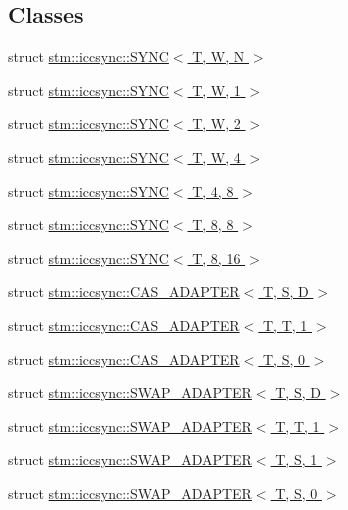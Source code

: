 \subsection*{Classes}
\begin{DoxyCompactItemize}
\item 
struct \hyperlink{structstm_1_1iccsync_1_1SYNC}{stm\-::iccsync\-::\-S\-Y\-N\-C$<$ T, W, N $>$}
\item 
struct \hyperlink{structstm_1_1iccsync_1_1SYNC_3_01T_00_01W_00_011_01_4}{stm\-::iccsync\-::\-S\-Y\-N\-C$<$ T, W, 1 $>$}
\item 
struct \hyperlink{structstm_1_1iccsync_1_1SYNC_3_01T_00_01W_00_012_01_4}{stm\-::iccsync\-::\-S\-Y\-N\-C$<$ T, W, 2 $>$}
\item 
struct \hyperlink{structstm_1_1iccsync_1_1SYNC_3_01T_00_01W_00_014_01_4}{stm\-::iccsync\-::\-S\-Y\-N\-C$<$ T, W, 4 $>$}
\item 
struct \hyperlink{structstm_1_1iccsync_1_1SYNC_3_01T_00_014_00_018_01_4}{stm\-::iccsync\-::\-S\-Y\-N\-C$<$ T, 4, 8 $>$}
\item 
struct \hyperlink{structstm_1_1iccsync_1_1SYNC_3_01T_00_018_00_018_01_4}{stm\-::iccsync\-::\-S\-Y\-N\-C$<$ T, 8, 8 $>$}
\item 
struct \hyperlink{structstm_1_1iccsync_1_1SYNC_3_01T_00_018_00_0116_01_4}{stm\-::iccsync\-::\-S\-Y\-N\-C$<$ T, 8, 16 $>$}
\item 
struct \hyperlink{structstm_1_1iccsync_1_1CAS__ADAPTER}{stm\-::iccsync\-::\-C\-A\-S\-\_\-\-A\-D\-A\-P\-T\-E\-R$<$ T, S, D $>$}
\item 
struct \hyperlink{structstm_1_1iccsync_1_1CAS__ADAPTER_3_01T_00_01T_00_011_01_4}{stm\-::iccsync\-::\-C\-A\-S\-\_\-\-A\-D\-A\-P\-T\-E\-R$<$ T, T, 1 $>$}
\item 
struct \hyperlink{structstm_1_1iccsync_1_1CAS__ADAPTER_3_01T_00_01S_00_010_01_4}{stm\-::iccsync\-::\-C\-A\-S\-\_\-\-A\-D\-A\-P\-T\-E\-R$<$ T, S, 0 $>$}
\item 
struct \hyperlink{structstm_1_1iccsync_1_1SWAP__ADAPTER}{stm\-::iccsync\-::\-S\-W\-A\-P\-\_\-\-A\-D\-A\-P\-T\-E\-R$<$ T, S, D $>$}
\item 
struct \hyperlink{structstm_1_1iccsync_1_1SWAP__ADAPTER_3_01T_00_01T_00_011_01_4}{stm\-::iccsync\-::\-S\-W\-A\-P\-\_\-\-A\-D\-A\-P\-T\-E\-R$<$ T, T, 1 $>$}
\item 
struct \hyperlink{structstm_1_1iccsync_1_1SWAP__ADAPTER_3_01T_00_01S_00_011_01_4}{stm\-::iccsync\-::\-S\-W\-A\-P\-\_\-\-A\-D\-A\-P\-T\-E\-R$<$ T, S, 1 $>$}
\item 
struct \hyperlink{structstm_1_1iccsync_1_1SWAP__ADAPTER_3_01T_00_01S_00_010_01_4}{stm\-::iccsync\-::\-S\-W\-A\-P\-\_\-\-A\-D\-A\-P\-T\-E\-R$<$ T, S, 0 $>$}
\end{DoxyCompactItemize}
